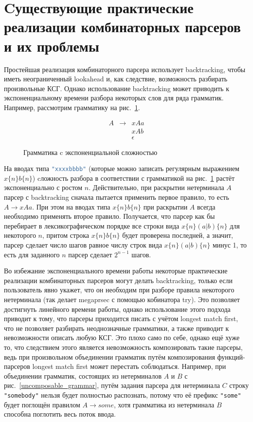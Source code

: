 \documentclass[times]{itmo-student-thesis}
\begin{document}
\section{Cуществующие практические реализации комбинаторных парсеров и их проблемы}\label{sec:current_parser_combinators_problems}

Простейшая реализация комбинаторного парсера использует backtracking, чтобы иметь неограниченный lookahead и, как
следствие, возможность разбирать произвольные КСГ. Однако использование backtracking может приводить к
экспоненциальному времени разбора некоторых слов для ряда грамматик. Например, рассмотрим грамматику на
рис.~\ref{exp_grammar}.

\begin{figure}[!h]
\caption{Грамматика c экспоненциальной сложностью}\label{exp_grammar}
\[
    \begin{array}{lll}
        A & \to & xAa      \\
          &     & xAb      \\
          &     & \epsilon
    \end{array}
\]
\end{figure}

На вводах типа \lstinline[language=Haskell]{"xxxxbbbb"} (которые можно записать регулярным выражением $x\{n\}b\{n\}$) cложность разбора
в соответствии с грамматикой на рис.~\ref{exp_grammar} растёт экспоненциально с ростом $n$.
Действительно, при раскрытии нетерминала $A$ парсер с backtracking сначала пытается применить первое
правило, то есть $A \to xAa$. При этом на вводах типа $x\{n\}b\{n\}$ при раскрытии
$A$ всегда необходимо применять второе правило. Получается, что парсер как бы перебирает в
лексикографическом порядке все строки вида $x\{n\}(a|b)\{n\}$ для некоторого $n$, притом строка
$x\{n\}b\{n\}$ будет проверена последней, а значит, парсер сделает число шагов равное числу строк вида
$x\{n\}(a|b)\{n\}$ минус 1, то есть для заданного $n$ парсер сделает $2^{n-1}$ шагов.

Во избежание экспоненциального времени работы некоторые практические реализации комбинаторных парсеров могут делать
backtracking, только если пользователь явно укажет, что он необходим при разборе правила некоторого нетерминала (так
делает megaprsec\cite{megaparsec} с помощью кобинатора try). Это позволяет достигнуть линейного времени работы,
однако использование этого подхода приводит к тому, что парсеры приходится писать с учётом longest match first, что не
позволяет разбирать неоднозначные грамматики, а также приводит к невозможности описать любую КСГ. Это плохо само по
себе, однако ещё хуже то, что следствием этого является невозможность композировать такие парсеры, ведь при
произвольном объединении грамматик путём композирования функций-парсеров longest match first может перестать
соблюдаться. Например, при объединении грамматик, состоящих из нетерминалов $A$ и
$B$ с рис.~\ref{uncomposable_grammar}, путём задания парсера для нетерминала $C$ строку
\lstinline|"somebody"| нельзя будет полностью распознать, потому что её префикс \lstinline|"some"| будет поглощён правилом
$A \to some$, хотя грамматика из нетерминала $B$ способна поглотить весь поток ввода.
\end{document}
